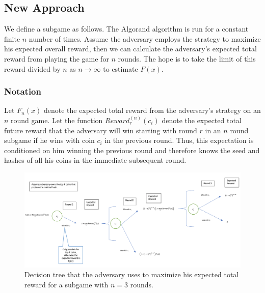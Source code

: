 \documentclass[11pt, oneside]{article}   	%
\begin{document}
\subsection{New Approach}
We define a subgame as follows. The Algorand algorithm is run for a constant finite $n$ number of times. Assume the adversary employs the strategy to maximize his expected overall reward, then we can calculate the adversary's expected total reward from playing the game for $n$ rounds. The hope is to take the limit of this reward divided by $n$ as $n\rightarrow \infty$ to estimate $F(x)$.

\subsubsection{Notation}
Let $F_n(x)$ denote the expected total reward from the adversary's strategy on an $n$ round game. Let the function $Reward^{(n)}_{r}(c_i)$ denote the expected total future reward that the adversary will win starting with round $r$ in an $n$ round subgame if he wins with coin $c_i$ in the previous round. Thus, this expectation is conditioned on him winning the previous round and therefore knows the seed and hashes of all his coins in the immediate subsequent round.


\begin{figure}
\centering
\includegraphics[width=1\textwidth]{decision_tree.png}
\caption{\label{fig:decision_tree}Decision tree that the adversary uses to maximize his expected total reward for a subgame with $n=3$ rounds.}
\end{figure}
\end{document}
